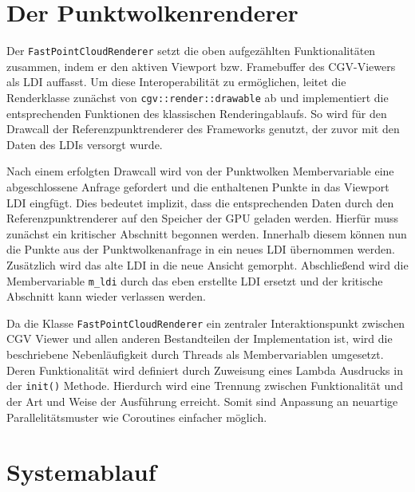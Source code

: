 \documentclass[hyperref, beleg, german]{cgvpub}
\begin{document}
\section{Der Punktwolkenrenderer}

Der \texttt{FastPointCloudRenderer} setzt die oben aufgezählten
Funktionalitäten zusammen, indem er den aktiven Viewport bzw. Framebuffer des
CGV-Viewers als LDI auffasst. Um diese Interoperabilität zu ermöglichen, leitet
die Renderklasse zunächst von \texttt{cgv::render::drawable} ab und
implementiert die entsprechenden Funktionen des klassischen Renderingablaufs.
So wird für den Drawcall der Referenzpunktrenderer des Frameworks genutzt, der
zuvor mit den Daten des LDIs versorgt wurde.

Nach einem erfolgten Drawcall wird von der Punktwolken Membervariable eine
abgeschlossene Anfrage gefordert und die enthaltenen Punkte in das Viewport LDI
eingfügt. Dies bedeutet implizit, dass die entsprechenden Daten durch den
Referenzpunktrenderer auf den Speicher der GPU geladen werden. Hierfür muss
zunächst ein kritischer Abschnitt begonnen werden. Innerhalb diesem können nun
die Punkte aus der Punktwolkenanfrage in ein neues LDI übernommen werden.
Zusätzlich wird das alte LDI in die neue Ansicht gemorpht. Abschließend wird die
Membervariable \texttt{m\_ldi} durch das eben erstellte LDI ersetzt und der
kritische Abschnitt kann wieder verlassen werden.

Da die Klasse \texttt{FastPointCloudRenderer} ein zentraler Interaktionspunkt
zwischen CGV Viewer und allen anderen Bestandteilen der Implementation ist, wird
die beschriebene Nebenläufigkeit durch Threads als Membervariablen umgesetzt.
Deren Funktionalität wird definiert durch Zuweisung eines Lambda Ausdrucks in
der \texttt{init()} Methode. Hierdurch wird eine Trennung zwischen
Funktionalität und der Art und Weise der Ausführung erreicht. Somit sind
Anpassung an neuartige Parallelitätsmuster wie Coroutines einfacher möglich.

\section{Systemablauf}
\end{document}
